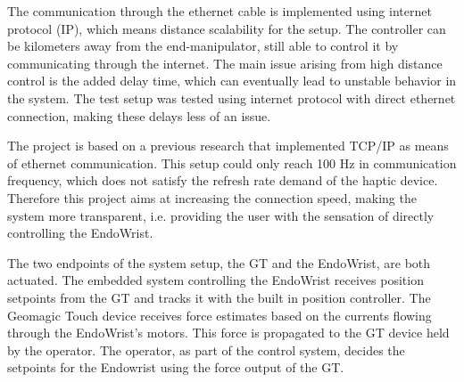 The communication through the ethernet cable is implemented using internet protocol (IP), which means distance scalability for the setup. The controller can be kilometers away from the end-manipulator, still able to control it by communicating through the internet. The main issue arising from high distance control is the added delay time, which can eventually lead to unstable behavior in the system. The test setup was tested using internet protocol with direct ethernet connection, making these delays less of an issue.

The project is based on a previous research that implemented TCP/IP as means of ethernet communication. This setup could only reach 100 Hz in communication frequency, which does not satisfy the refresh rate demand of the haptic device\cite{Chris_Surgical}\cite{coles2011role}. Therefore this project aims at increasing the connection speed, making the system more transparent, i.e. providing the user with the sensation of directly controlling the EndoWrist.

The two endpoints of the system setup, the GT and the EndoWrist, are both actuated. The embedded system controlling the EndoWrist receives position setpoints from the GT and tracks it with the built in position controller.
The Geomagic Touch device receives force estimates based on the currents flowing through the EndoWrist's motors. This force is propagated to the GT device held by the operator. The operator, as part of the control system, decides the setpoints for the Endowrist using the force output of the GT. %



%